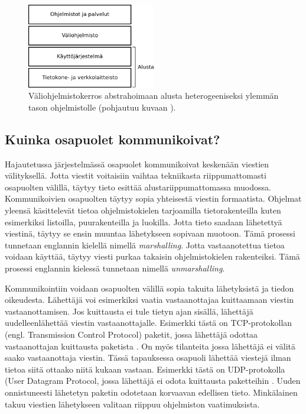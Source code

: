 \begin{figure}[ht!]
	\includegraphics[width=0.5\textwidth]{pictures/middleware-architecture.png}
	\caption{Väliohjelmistokerros abstrahoimaan alusta heterogeeniseksi ylemmän tason ohjelmistolle (pohjautuu kuvaan \mbox{\cite[s.~52]{distributed-systems-concepts-and-design}}).}
	\label{fig:middleware-architecture}
\end{figure}


\subsection{Kuinka osapuolet kommunikoivat?}
Hajautetussa järjestelmässä osapuolet kommunikoivat keskenään viestien välityksellä. Jotta viestit voitaisiin vaihtaa tekniikasta riippumattomasti osapuolten välillä, täytyy tieto esittää alustariippumattomassa muodossa. Kommunikoivien osapuolten täytyy sopia yhteisestä viestin formaatista. Ohjelmat yleensä käsittelevät tietoa ohjelmistokielen tarjoamilla tietorakenteilla kuten esimerkiksi listoilla, puurakenteilla ja luokilla. Jotta tieto saadaan lähetettyä viestinä, täytyy se ensin muuntaa lähetykseen sopivaan muotoon. Tämä prosessi tunnetaan englannin kielellä nimellä \emph{marshalling}. Jotta vastaanotettua tietoa voidaan käyttää, täytyy viesti purkaa takaisin ohjelmistokielen rakenteiksi. Tämä prosessi englannin kielessä tunnetaan nimellä \emph{unmarshalling}. \mbox{\cite[s.~158]{distributed-systems-concepts-and-design}}

Kommunikointiin voidaan osapuolten välillä sopia takuita lähetyksistä ja tiedon oikeudesta. Lähettäjä voi esimerkiksi vaatia vastaanottajaa kuittaamaan viestin vastaanottamisen. Jos kuittausta ei tule tietyn ajan sisällä, lähettäjä uudelleenlähettää viestin vastaanottajalle. Esimerkki tästä on TCP-protokollan (engl. Transmission Control Protocol) paketit, jossa lähettäjä odottaa vastaanottajan kuittausta paketista \cite[s.~9--10]{tcp-standard}. On myös tilanteita jossa lähettäjä ei välitä saako vastaanottaja viestin. Tässä tapauksessa osapuoli lähettää viestejä ilman tietoa siitä ottaako niitä kukaan vastaan. Esimerkki tästä on UDP-protokolla (User Datagram Protocol, jossa lähettäjä ei odota kuittausta paketteihin \cite{udp-standard}. Uuden onnistuneesti lähetetyn paketin odotetaan korvaavan edellisen tieto. Minkälainen takuu viestien lähetykseen valitaan riippuu ohjelmiston vaatimuksista.


